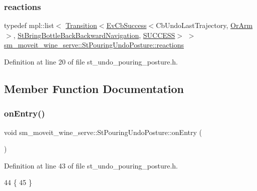 \subsubsection{\texorpdfstring{reactions}{reactions}}
{\footnotesize\ttfamily typedef mpl\+::list$<$ \hyperlink{classsmacc_1_1Transition}{Transition}$<$\hyperlink{structsmacc_1_1EvCbSuccess}{Ev\+Cb\+Success}$<$Cb\+Undo\+Last\+Trajectory, \hyperlink{classsm__moveit__wine__serve_1_1OrArm}{Or\+Arm}$>$, \hyperlink{structsm__moveit__wine__serve_1_1StBringBottleBackBackwardNavigation}{St\+Bring\+Bottle\+Back\+Backward\+Navigation}, \hyperlink{structsmacc_1_1default__transition__tags_1_1SUCCESS}{S\+U\+C\+C\+E\+SS}$>$ $>$ \hyperlink{structsm__moveit__wine__serve_1_1StPouringUndoPosture_aafb240153173fa5a72cb42280e003b26}{sm\+\_\+moveit\+\_\+wine\+\_\+serve\+::\+St\+Pouring\+Undo\+Posture\+::reactions}}



Definition at line 20 of file st\+\_\+undo\+\_\+pouring\+\_\+posture.\+h.



\subsection{Member Function Documentation}
\mbox{\label{structsm__moveit__wine__serve_1_1StPouringUndoPosture_aefad9969ee8ec5b1687faaab2b6127f8}} 
\subsubsection{\texorpdfstring{on\+Entry()}{onEntry()}}
{\footnotesize\ttfamily void sm\+\_\+moveit\+\_\+wine\+\_\+serve\+::\+St\+Pouring\+Undo\+Posture\+::on\+Entry (\begin{DoxyParamCaption}{ }\end{DoxyParamCaption})\hspace{0.3cm}{\ttfamily [inline]}}



Definition at line 43 of file st\+\_\+undo\+\_\+pouring\+\_\+posture.\+h.


\begin{DoxyCode}
44         \{
45         \}
\end{DoxyCode}
\mbox{\label{structsm__moveit__wine__serve_1_1StPouringUndoPosture_ad6034eaf66a0c5d236911bf16038dcef}} 
